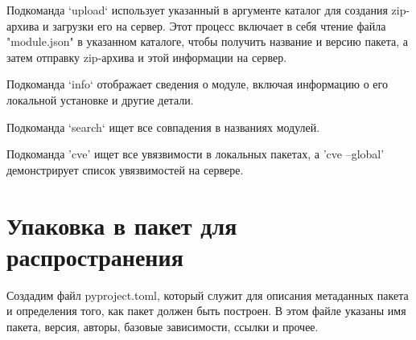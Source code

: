 Подкоманда `upload` использует указанный в аргументе каталог для создания zip-архива и загрузки его на сервер. Этот процесс включает в себя чтение файла "module.json" в указанном каталоге, чтобы получить название и версию пакета, а затем отправку zip-архива и этой информации на сервер.

Подкоманда `info` отображает сведения о модуле, включая информацию о его локальной установке и другие детали.

Подкоманда `search` ищет все совпадения в названиях модулей.

Подкоманда 'cve' ищет все увязвимости в локальных пакетах, а 'cve --global' демонстрирует список увязвимостей на сервере.

\section{Упаковка в пакет для распространения}

Создадим файл pyproject.toml, который служит для описания метаданных пакета и определения того, как пакет должен быть построен. В этом файле указаны имя пакета, версия, авторы, базовые зависимости, ссылки и прочее. 

\begin{listing}[H]
\end{listing}
\label{lst:c}



